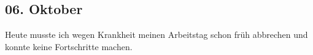 \subsection{06. Oktober}
Heute musste ich wegen Krankheit meinen Arbeitstag schon früh abbrechen und konnte keine Fortschritte machen.
